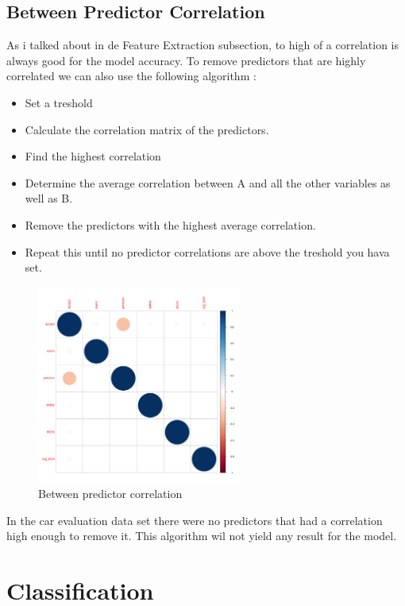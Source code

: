 \documentclass[a4paper, 12pt]{article}
\begin{document}
\subsection{Between Predictor Correlation}
As i talked about in de Feature Extraction subsection, to high of a correlation is always good for the model accuracy. To remove predictors that are highly correlated we can also use the following algorithm \cite{modeling-book}:
\begin{itemize}
\item Set a treshold
\item Calculate the correlation matrix of the predictors.
\item Find the highest correlation
\item Determine the average correlation between A and all the other variables as well as B.
\item Remove the predictors with the highest average correlation.
\item Repeat this until no predictor correlations are above the treshold you hava set.
\end{itemize}

  \begin{figure}[h]
    \centering 
    \includegraphics[width=0.6\textwidth]
    {images/correlation}
    \caption{Between predictor correlation}
    \label{fig:correlation}
  \end{figure}

In the car evaluation data set there were no predictors that had a correlation high enough to remove it. This algorithm wil not yield any result for the model.

\section{Classification}
\end{document}
